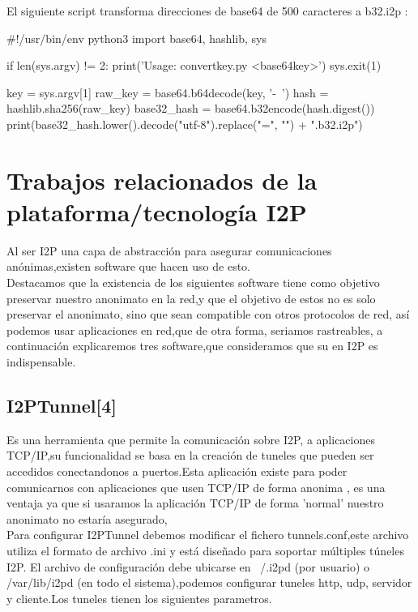 \documentclass{article}
\begin{document}
 El siguiente script transforma direcciones de base64 de 500 caracteres a b32.i2p :
 
 #!/usr/bin/env python3
import base64, hashlib, sys

if len(sys.argv) != 2:
  print('Usage: convertkey.py <base64key>')
  sys.exit(1)

key = sys.argv[1]
raw_key = base64.b64decode(key, '-~')
hash = hashlib.sha256(raw_key)
base32_hash = base64.b32encode(hash.digest())
print(base32_hash.lower().decode("utf-8").replace("=", "") + ".b32.i2p")
 
 

\pagebreak

\section{Trabajos relacionados de la plataforma/tecnología I2P}

Al ser  I2P una capa de abstracción para asegurar comunicaciones anónimas,existen software que hacen uso de esto.
\\

Destacamos que la existencia de los siguientes software tiene como objetivo preservar nuestro anonimato en la red,y que el objetivo de estos no es solo preservar
el anonimato, sino que sean compatible con otros protocolos de red, así podemos usar aplicaciones en red,que de otra forma, seriamos rastreables,
a continuación explicaremos tres software,que consideramos que su en I2P  es indispensable.
\subsection{I2PTunnel[4]}

Es una herramienta que permite la comunicación sobre I2P, a aplicaciones TCP/IP,su funcionalidad se basa en la creación de tuneles que pueden ser accedidos
conectandonos a puertos.Esta aplicación existe para poder comunicarnos con aplicaciones que usen TCP/IP de forma anonima , es una ventaja ya que si usaramos la aplicación TCP/IP de forma 'normal'
nuestro anonimato no estaría asegurado,
\\

Para configurar I2PTunnel debemos modificar el fichero tunnels.conf,este archivo utiliza el formato de archivo .ini y está diseñado para soportar múltiples túneles I2P. El archivo 
de configuración debe ubicarse en  ~/.i2pd (por usuario) o /var/lib/i2pd (en todo el sistema),podemos configurar tuneles http, udp, servidor y cliente.Los tuneles tienen los 
siguientes parametros.
\\
\end{document}
